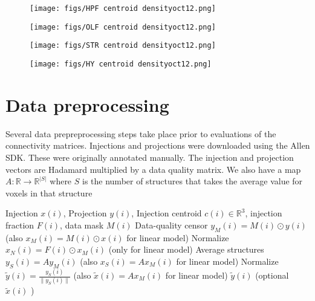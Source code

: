 \documentclass{article}
\begin{document}
\begin{figure}[H]
    \centering
    \texttt{[image: figs/HPF centroid densityoct12.png]} 
    \label{fig:my_label}
\end{figure}
\newpage

\begin{figure}[H]
    \centering
    \texttt{[image: figs/OLF centroid densityoct12.png]} 
    \label{fig:my_label}
\end{figure}
\newpage

\begin{figure}[H]
    \centering
    \texttt{[image: figs/STR centroid densityoct12.png]} 
    \label{fig:my_label}
\end{figure}
\newpage

\begin{figure}[H]
    \centering
    \texttt{[image: figs/HY centroid densityoct12.png]} 
    \label{fig:my_label}
\end{figure}

\newpage


\section{Data preprocessing}




\label{sec:dp}

Several data prepreprocessing steps take place prior to evaluations of the connectivity matrices.
Injections and projections were downloaded using the Allen SDK.
These were originally annotated manually.
The injection and projection vectors are Hadamard multiplied by a data quality matrix. We also have a map $A: \mathbb R \to \mathbb R^{|S|}$ where $S$ is the number of structures that takes the average value for voxels in that structure

\begin{algorithmic}
\label{alg:norm}
\begin{algorithm}{Injection $x(i)$, Projection $y(i)$, Injection centroid $c(i) \in \mathbb R^3$, injection fraction $F(i)$, data mask $M(i)$}
\STATE Data-quality censor $y_M (i) = M(i) \odot y(i)$ (also $x_M(i) = M(i) \odot x(i)$ for linear model)
\STATE Normalize $x_N(i) = F(i) \odot x_M(i)$ (only for linear model)
\STATE Average structures $y_S (i) = A y_M(i)$ (also $x_S (i) = A x_M(i)$ for linear model)
\STATE Normalize $\tilde y(i) = \frac{y_S (i)}{\|y_S (i)\|}$ (also $\tilde x (i) = A x_M(i)$ for linear model)
 \RETURN $\tilde y(i)$ (optional $\tilde x(i)$ )
\end{algorithm}
\end{algorithmic}
\end{document}
